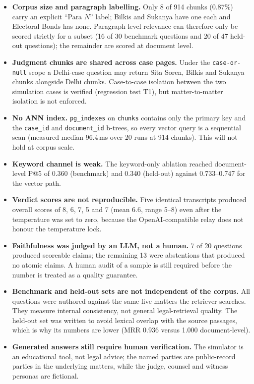 \documentclass[12pt]{article}
\begin{document}
\begin{itemize}
\item \textbf{Corpus size and paragraph labelling.} Only 8 of 914 chunks (0.87\%) carry an explicit ``Para $N$'' label; Bilkis and Sukanya have one each and Electoral Bonds has none. Paragraph-level relevance can therefore only be scored strictly for a subset (16 of 30 benchmark questions and 20 of 47 held-out questions); the remainder are scored at document level.
\item \textbf{Judgment chunks are shared across case pages.} Under the \texttt{case-or-null} scope a Delhi-case question may return Sita Soren, Bilkis and Sukanya chunks alongside Delhi chunks. Case-to-case isolation between the two simulation cases is verified (regression test T1), but matter-to-matter isolation is not enforced.
\item \textbf{No ANN index.} \texttt{pg\_indexes} on \texttt{chunks} contains only the primary key and the \texttt{case\_id} and \texttt{document\_id} b-trees, so every vector query is a sequential scan (measured median 96.4\,ms over 20 runs at 914 chunks). This will not hold at corpus scale.
\item \textbf{Keyword channel is weak.} The keyword-only ablation reached document-level P@5 of 0.360 (benchmark) and 0.340 (held-out) against 0.733--0.747 for the vector path.
\item \textbf{Verdict scores are not reproducible.} Five identical transcripts produced overall scores of 8, 6, 7, 5 and 7 (mean 6.6, range 5--8) even after the temperature was set to zero, because the OpenAI-compatible relay does not honour the temperature lock.
\item \textbf{Faithfulness was judged by an LLM, not a human.} 7 of 20 questions produced scoreable claims; the remaining 13 were abstentions that produced no atomic claims. A human audit of a sample is still required before the number is treated as a quality guarantee.
\item \textbf{Benchmark and held-out sets are not independent of the corpus.} All questions were authored against the same five matters the retriever searches. They measure internal consistency, not general legal-retrieval quality. The held-out set was written to avoid lexical overlap with the source passages, which is why its numbers are lower (MRR 0.936 versus 1.000 document-level).
\item \textbf{Generated answers still require human verification.} The simulator is an educational tool, not legal advice; the named parties are public-record parties in the underlying matters, while the judge, counsel and witness personas are fictional.
\end{itemize}
\end{document}
